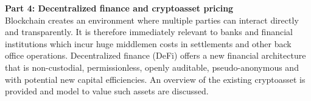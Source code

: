 \documentclass[11pt]{article}
\def\courseWebpage{\href{http://www.math.ucsd.edu/~mhohn/PSTAT_120A_S17/}{www.math.ucsd.edu/$\sim$mhohn/PSTAT\_120A\_S17/}}
\begin{document}
\noindent \textbf{Part 4: Decentralized finance and cryptoasset pricing}\\
\noindent Blockchain creates an environment where multiple parties can interact directly and transparently. It is therefore immediately relevant to banks and financial institutions which incur huge middlemen costs in settlements and other back office operations. Decentralized finance (DeFi) offers a new financial architecture that is non-custodial, permissionless, openly auditable, pseudo-anonymous and with potential new capital efficiencies. An overview of the existing cryptoasset is provided and model to value such assets are discussed. 







\end{document}

